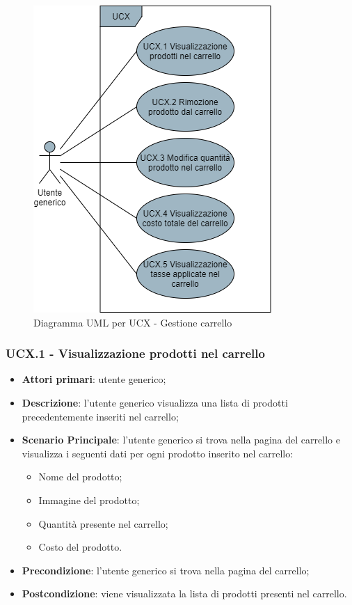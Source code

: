\begin{figure}[H]
\centering
\includegraphics[scale=0.6]{res/UseCase/Immagini/GestioneCarrello}
\caption{Diagramma UML per UCX - Gestione carrello}
\end{figure}

\subsubsection{UCX.1 - Visualizzazione prodotti nel carrello}
\begin{itemize}
\item \textbf{Attori primari}: utente generico;
\item \textbf{Descrizione}: l'utente generico visualizza una lista di prodotti precedentemente inseriti nel carrello;
\item \textbf{Scenario Principale}: l'utente generico si trova nella pagina del carrello e visualizza i seguenti dati per ogni prodotto inserito nel carrello:
\begin{itemize}
\item Nome del prodotto;
\item Immagine del prodotto;
\item Quantità presente nel carrello;
\item Costo del prodotto.
\end{itemize}
\item \textbf{Precondizione}: l'utente generico si trova nella pagina del carrello;
\item \textbf{Postcondizione}: viene visualizzata la lista di prodotti presenti nel carrello.
\end{itemize}

